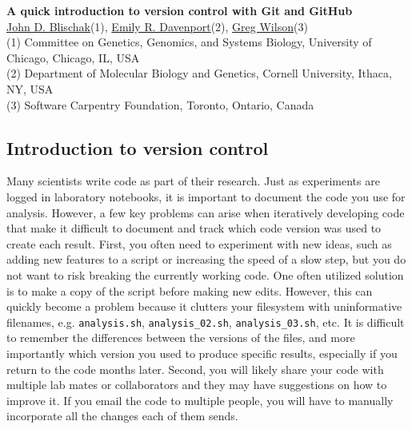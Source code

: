 \documentclass[10pt]{article}
\date{}
\begin{document}
\begin{flushleft}
{\LARGE
\textbf{A quick introduction to version control with Git and GitHub}
}
\\

\href{https://www.authorea.com/users/5990}{John D. Blischak}(1), \href{https://www.authorea.com/users/16152}{Emily R. Davenport}(2), \href{https://www.authorea.com/users/18131}{Greg Wilson}(3)\\

(1) Committee on Genetics, Genomics, and Systems Biology, University of Chicago, Chicago, IL, USA\\
(2) Department of Molecular Biology and Genetics, Cornell University, Ithaca, NY, USA\\
(3) Software Carpentry Foundation, Toronto, Ontario, Canada

\end{flushleft}





\subsection{Introduction to version control}

Many scientists write code as part of their research.
Just as experiments are logged in laboratory notebooks, it is important to document the code you use for analysis.
However, a few key problems can arise when iteratively developing code that make it difficult to document and track which code version was used to create each result.
First, you often need to experiment with new ideas, such as adding new features to a script or increasing the speed of a slow step, but you do not want to risk breaking the currently working code.
One often utilized solution is to make a copy of the script before making new edits.
However, this can quickly become a problem because it clutters your filesystem with uninformative filenames, e.g. \verb|analysis.sh|, \verb|analysis_02.sh|, \verb|analysis_03.sh|, etc.
It is difficult to remember the differences between the versions of the files, and more importantly which version you used to produce specific results, especially if you return to the code months later.
Second, you will likely share your code with multiple lab mates or collaborators and they may have suggestions on how to improve it.
If you email the code to multiple people, you will have to manually incorporate all the changes each of them sends.
\end{document}
